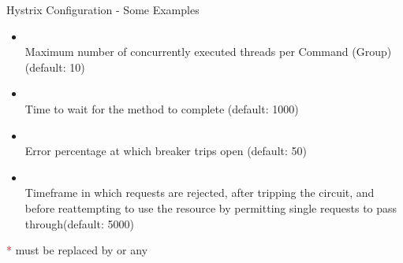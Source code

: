 \begin{frame}[fragile]{Hystrix Configuration - Some Examples}
\begin{itemize}
\scriptsize
\item {}
\\Maximum number of concurrently executed threads per Command (Group) (default: 10)
\item {}
\\Time to wait for the  method to complete (default: 1000)
\item {}
\\Error percentage at which breaker trips open (default: 50)
\item {}
\\Timeframe in which requests are rejected, after tripping the circuit, and before reattempting to use the resource by permitting single requests to pass through(default: 5000)
\end{itemize}
\footnotesize{\textcolor{red}{*} must be replaced by  or any }
\vfill
{}
\end{frame}

